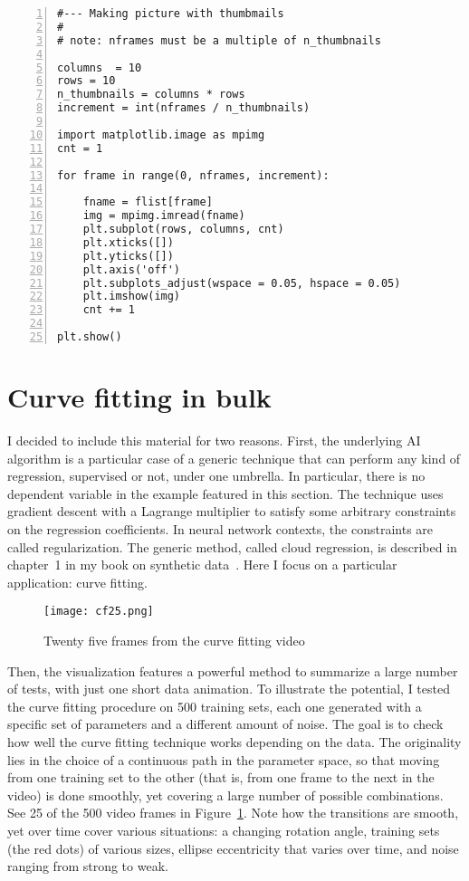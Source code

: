 \documentclass[oneside,10pt]{book}
\begin{document}
\begin{lstlisting}[numbers=left]
#--- Making picture with thumbmails
#
# note: nframes must be a multiple of n_thumbnails

columns  = 10
rows = 10
n_thumbnails = columns * rows
increment = int(nframes / n_thumbnails) 

import matplotlib.image as mpimg
cnt = 1

for frame in range(0, nframes, increment):

    fname = flist[frame]
    img = mpimg.imread(fname)
    plt.subplot(rows, columns, cnt)
    plt.xticks([])  
    plt.yticks([])
    plt.axis('off')
    plt.subplots_adjust(wspace = 0.05, hspace = 0.05)
    plt.imshow(img)
    cnt += 1

plt.show()
\end{lstlisting}

\section{Curve fitting in bulk}\label{assamero}

I decided to include this material for two reasons. First, the underlying AI algorithm is a particular case of a generic technique that can perform any kind of regression, supervised or not, under one umbrella. In particular, there is no dependent variable in the example featured in this section.
 The technique uses \textcolor{index}{gradient descent} with a \textcolor{index}{Lagrange multiplier} to satisfy some arbitrary constraints on the regression coefficients. 
 In neural network contexts, the constraints are called \textcolor{index}{regularization}. 
The generic method, called \textcolor{index}{cloud regression}, 
is described in chapter~1 in my book on synthetic data~\cite{vgsynthetic}. Here I focus on a particular application:
 \textcolor{index}{curve fitting}.

\begin{figure}[H]
\centering
\texttt{[image: cf25.png]}   
\caption{Twenty five frames from the curve fitting video}
\label{ringersap25r}
\end{figure}

Then, the visualization features a powerful method to summarize a large number of tests, with just one short data animation.
 To illustrate the potential, I tested the curve fitting procedure on 500 training sets, each one generated with
 a specific set of parameters and a different amount of noise. The goal is to check how well the curve fitting technique works depending on the data.
The originality lies in the choice of a continuous path in the parameter space, so that moving from one training set to the other (that is, from one frame
 to the next in the video) is done smoothly, yet covering a large number of possible combinations.
See 25 of the 500 video frames in Figure~\ref{ringersap25r}. Note how the transitions are smooth, yet over time cover various situations:
 a changing rotation angle, training sets (the red dots) of various sizes, ellipse eccentricity that varies over time, and noise ranging from strong to weak. 
\end{document}

